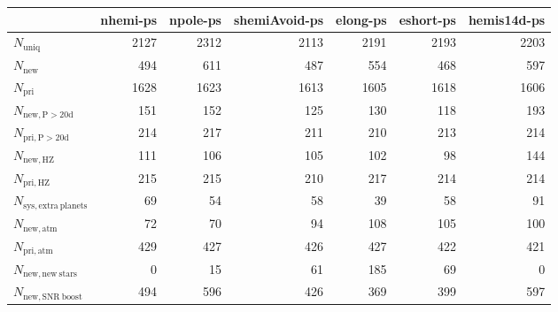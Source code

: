 \begin{tabular}{lrrrrrr}
\toprule
{} &  nhemi-ps &  npole-ps &  shemiAvoid-ps &  elong-ps &  eshort-ps &  hemis14d-ps \\
\midrule
$N_{\mathrm{uniq}}$               &      2127 &      2312 &           2113 &      2191 &       2193 &         2203 \\
$N_{\mathrm{new}}$                &       494 &       611 &            487 &       554 &        468 &          597 \\
$N_{\mathrm{pri}}$                &      1628 &      1623 &           1613 &      1605 &       1618 &         1606 \\
$N_{\mathrm{new,P>20d}}$          &       151 &       152 &            125 &       130 &        118 &          193 \\
$N_{\mathrm{pri,P>20d}}$          &       214 &       217 &            211 &       210 &        213 &          214 \\
$N_{\mathrm{new,HZ}}$             &       111 &       106 &            105 &       102 &         98 &          144 \\
$N_{\mathrm{pri,HZ}}$             &       215 &       215 &            210 &       217 &        214 &          214 \\
$N_{\mathrm{sys,extra\ planets}}$ &        69 &        54 &             58 &        39 &         58 &           91 \\
$N_{\mathrm{new,atm}}$            &        72 &        70 &             94 &       108 &        105 &          100 \\
$N_{\mathrm{pri,atm}}$            &       429 &       427 &            426 &       427 &        422 &          421 \\
$N_{\mathrm{new,new\ stars}}$     &         0 &        15 &             61 &       185 &         69 &            0 \\
$N_{\mathrm{new,SNR\ boost}}$     &       494 &       596 &            426 &       369 &        399 &          597 \\
\bottomrule
\end{tabular}
